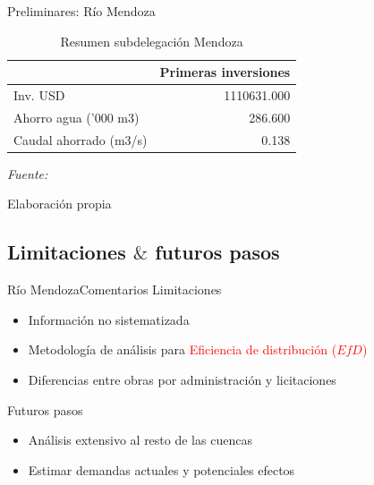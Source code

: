 \documentclass{beamer}\usepackage[]{graphicx}\usepackage[]{color}
\begin{document}
\begin{frame}{Preliminares: Río Mendoza}
\vspace{-.55cm}
\begin{table}[H]

\caption{\label{tab:MendozaInv}\label{MendozaInv}Resumen subdelegación Mendoza}
\centering
\fontsize{10}{12}\selectfont
\begin{threeparttable}
\begin{tabular}[t]{lr}
\toprule
  & Primeras inversiones\\
\midrule
Inv. USD & 1110631.000\\
Ahorro agua ('000 m3) & 286.600\\
Caudal ahorrado (m3/s) & 0.138\\
\bottomrule
\end{tabular}
\begin{tablenotes}[para]
\item \textit{Fuente: } 
\item Elaboración propia
\end{tablenotes}
\end{threeparttable}
\end{table}


\end{frame}





\subsection{Limitaciones $\&$ futuros pasos}
\begin{frame}{Río Mendoza}{Comentarios}
  Limitaciones
  \begin{itemize}
         \item Información no sistematizada          
  \pause \item Metodología de análisis para \textcolor{red}{Eficiencia de distribución ($EfD$)}
  \pause \item Diferencias entre obras por administración y licitaciones
  \end{itemize}
  
  Futuros pasos
  \begin{itemize}
  \pause \item Análisis extensivo al resto de las cuencas
  \pause \item Estimar demandas actuales y potenciales efectos
  \end{itemize}
\end{frame}
\end{document}
